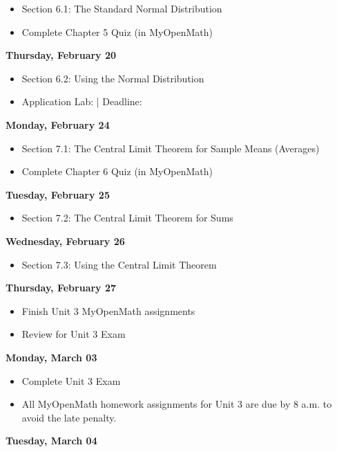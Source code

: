 \documentclass[11pt]{article}
\begin{document}
\begin{itemize}
\item Section 6.1: The Standard Normal Distribution
\item Complete Chapter 5 Quiz (in MyOpenMath)
\end{itemize}

\textbf{Thursday, February 20}

\begin{itemize}
\item Section 6.2: Using the Normal Distribution
\item Application Lab: | Deadline:
\end{itemize}

\textbf{Monday, February 24}

\begin{itemize}
\item Section 7.1: The Central Limit Theorem for Sample Means (Averages)
\item Complete Chapter 6 Quiz (in MyOpenMath)
\end{itemize}

\textbf{Tuesday, February 25}

\begin{itemize}
\item Section 7.2: The Central Limit Theorem for Sums
\end{itemize}

\textbf{Wednesday, February 26}

\begin{itemize}
\item Section 7.3: Using the Central Limit Theorem
\end{itemize}

\textbf{Thursday, February 27}

\begin{itemize}
\item Finish Unit 3 MyOpenMath assignments
\item Review for Unit 3 Exam
\end{itemize}

\textbf{Monday, March 03}

\begin{itemize}
\item Complete Unit 3 Exam
\item All MyOpenMath homework assignments for Unit 3 are due by 8 a.m. to avoid the late penalty.
\end{itemize}

\textbf{Tuesday, March 04}
\end{document}
